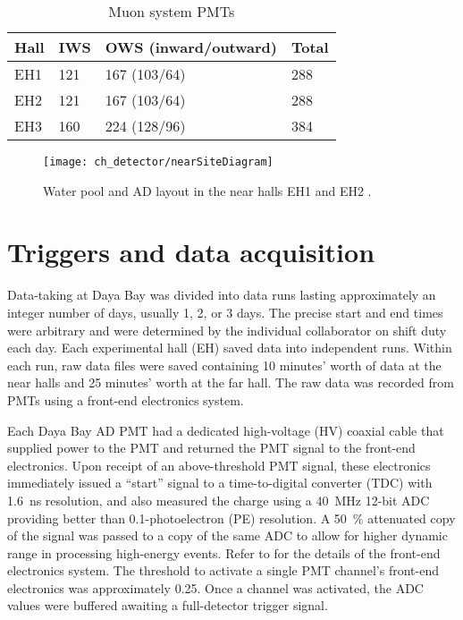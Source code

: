 \begin{table}[ht]
    \centering
    \begin{tabular}[t]{llll}
        \toprule
        Hall & IWS & OWS (inward/outward) & Total\\
        \midrule
        EH1 & 121 & 167 (103/64) & 288\\
        EH2 & 121 & 167 (103/64) & 288\\
        EH3 & 160 & 224 (128/96) & 384\\
        \bottomrule
    \end{tabular}
    \caption[Muon system PMTs]{Muon system PMTs \cite{muonsystem2015}}
    \label{tab:wp_pmts}
\end{table}

\begin{figure}
    \centering
    \texttt{[image: ch\_detector/nearSiteDiagram]}
    \caption[Water pool and AD layout]{
        Water pool and AD layout in the near halls EH1 and EH2
        \cite{sidebyside}.
    }
    \label{fig:wpcutout}
\end{figure}



\section{Triggers and data acquisition}
\label{sec:daq}

Data-taking at Daya Bay was divided into data runs
lasting approximately an integer number of days,
usually 1, 2, or 3 days.
The precise start and end times were arbitrary
and were determined by the individual collaborator
on shift duty each day.
Each experimental hall (EH) saved data into independent runs.
Within each run, raw data files were saved containing 10 minutes' worth of data
at the near halls and 25 minutes' worth at the far hall.
The raw data was recorded from PMTs using a front-end electronics system.

Each Daya Bay AD PMT had a dedicated high-voltage (HV) coaxial cable
that supplied power to the PMT and returned the PMT signal to the
front-end electronics.
Upon receipt of an above-threshold PMT signal, these electronics immediately
issued a ``start'' signal to a time-to-digital converter (TDC) with \SI{1.6}{\ns} resolution,
and also measured the charge using a \SI{40}{\MHz} \num{12}-bit ADC
providing better than \num{0.1}-photoelectron (PE) resolution.
A \SI{50}{\percent} attenuated copy of the signal was passed to a copy
of the same ADC to allow for higher dynamic range in processing high-energy
events.
Refer to \cite{sidebyside,ngd2016} for the details
of the front-end electronics system.
The threshold to activate a single PMT channel's front-end electronics
was approximately \SI{0.25}{\pe}.
Once a channel was activated, the ADC values were buffered
awaiting a full-detector trigger signal.

